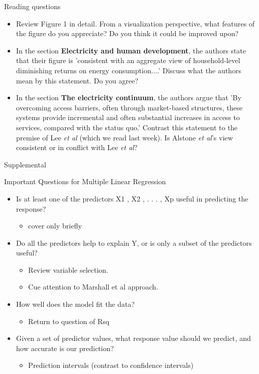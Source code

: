 \documentclass[aspectratio=169]{beamer}
\begin{document}
\begin{frame}{Reading questions}

\begin{itemize}
\item  Review Figure 1 in detail.  From a visualization perspective, what features of the figure do you appreciate?  Do you think it could be improved upon?
\item In the section \textbf{Electricity and human development}, the authors state that their figure is 'consistent with an aggregate view of household-level diminishing returns on energy consumption....'  Discuss what the authors mean by this statement.  Do you agree?
\item  In the section \textbf{The electricity continuum}, the authors argue that 'By overcoming access barriers, often through market-based structures, these systems provide incremental and often substantial increases in access to services, compared with the status quo.'  Contrast this statement to the premise of Lee \textit{et al} (which we read last week).  Is Alstone \textit{et al}'s view consistent or in conflict with Lee \textit{et al}?  
\end{itemize}

\end{frame}

\begin{frame}
Supplemental
\end{frame}


\begin{frame}{Important Questions for Multiple Linear Regression}
  \begin{itemize}
    \item Is at least one of the predictors X1 , X2 , . . . , Xp useful in predicting the response?
    \begin{itemize}
      \item cover only briefly
    \end{itemize}
    \item Do all the predictors help to explain Y, or is only a subset of the predictors useful?
    \begin{itemize}
      \item Review variable selection.  
      \item Cue attention to Marshall et al approach.
    \end{itemize}
    \item How well does the model fit the data?
    \begin{itemize}
      \item Return to question of Rsq
    \end{itemize}
    \item Given a set of predictor values, what response value should we predict, and how accurate is our prediction?  
    \begin{itemize}
      \item Prediction intervals (contrast to confidence intervals)
    \end{itemize}
  \end{itemize}
\end{frame}
\end{document}
